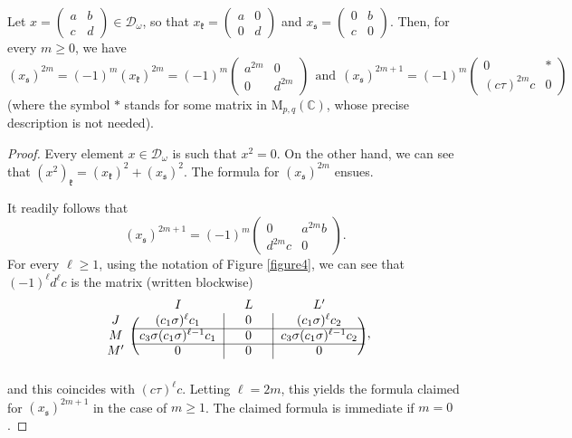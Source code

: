 \documentclass[ALCO,Unicode]{cedram}
\newcommand{\fk}{\mathfrak{k}}
\newcommand{\fs}{\mathfrak{s}}
\newcommand{\Mat}{\mathrm{M}}
\newcommand{\condir}{\mathcal{D}}
\newcommand{\mC}{\mathbb{C}}
\begin{document}
\begin{lemma}
\label{L4.8}
Let $x=\begin{pmatrix} a & b\\ c & d \end{pmatrix}\in\condir_\omega$, so that $x_\fk=\begin{pmatrix} a & 0\\ 0 & d\end{pmatrix}$ and $x_\fs=\begin{pmatrix} 0 & b\\ c & 0\end{pmatrix}$. Then, for every $m\geq 0$, we have
\[
(x_\fs)^{2m}=(-1)^m(x_\fk)^{2m}=(-1)^m\begin{pmatrix} a^{2m} & 0\\ 0 & d^{2m} \end{pmatrix}
\ \ \mbox{and}\ \
(x_\fs)^{2m+1}=(-1)^m\begin{pmatrix} 0 & *\\ (c\tau)^{2m}c & 0 \end{pmatrix}
\]
\textup{(}where the symbol $*$ stands for some matrix in $\Mat_{p,q}(\mC)$, whose precise description is not needed\textup{)}.
\end{lemma}

\begin{proof}
Every element $x\in\condir_\omega$ is such that $x^2=0$. On the other hand, we can see that $(x^2)_\fk=(x_\fk)^2+(x_\fs)^2$. The formula for $(x_\fs)^{2m}$ ensues.

It readily follows that
\[(x_\fs)^{2m+1}=(-1)^m\begin{pmatrix} 0 & a^{2m}b\\ d^{2m}c & 0 \end{pmatrix}.\]
For every $\ell\geq 1$, using the notation of Figure \ref{figure4},
we can see that $(-1)^\ell d^\ell c$ is the matrix (written
blockwise)
\begin{equation}
\label{powers1}
\begin{blockarray}{cccc}
{} & {\quad I\quad} & {\quad L\quad} & {\quad L'\quad}\\
\begin{block}{c(c|c|c)}
J & (c_1\sigma)^\ell c_1 & 0 & (c_1\sigma)^\ell c_2\\
\cline{2-4}
M & c_3\sigma(c_1\sigma)^{\ell-1}c_1 & 0 & c_3\sigma(c_1\sigma)^{\ell-1}c_2\\
\cline{2-4}
M' & 0 & 0 & 0\\
\end{block}
\end{blockarray}
\,,
\end{equation}
and this coincides with $(c\tau)^\ell c$.
Letting $\ell=2m$, this yields the formula claimed for $(x_\fs)^{2m+1}$ in the case of $m\geq 1$. The claimed formula is immediate if $m=0$.
\end{proof}
\end{document}
